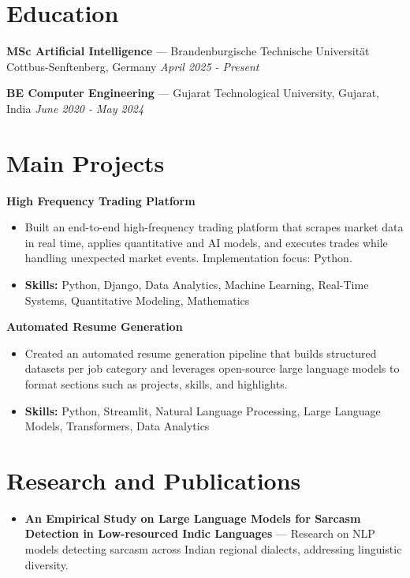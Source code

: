 \documentclass[a4paper,10pt]{article}
\begin{document}
\section*{Education}
\textbf{MSc Artificial Intelligence} — Brandenburgische Technische Universität Cottbus-Senftenberg, Germany \hfill \textit{April 2025 - Present}\par
\vspace{1.5pt}
\textbf{BE Computer Engineering} — Gujarat Technological University, Gujarat, India \hfill \textit{June 2020 - May 2024}\par

\section*{Main Projects}
\textbf{High Frequency Trading Platform}\par
\vspace{1pt}
\begin{itemize}
  \item Built an end-to-end high-frequency trading platform that scrapes market data in real time, applies quantitative and AI models, and executes trades while handling unexpected market events. Implementation focus: Python.
  \item \textbf{Skills:} Python, Django, Data Analytics, Machine Learning, Real-Time Systems, Quantitative Modeling, Mathematics
\end{itemize}
\vspace{3pt}
\textbf{Automated Resume Generation}\par
\vspace{1pt}
\begin{itemize}
  \item Created an automated resume generation pipeline that builds structured datasets per job category and leverages open-source large language models to format sections such as projects, skills, and highlights.
  \item \textbf{Skills:} Python, Streamlit, Natural Language Processing, Large Language Models, Transformers, Data Analytics
\end{itemize}

\section*{Research and Publications}
\begin{itemize}
\item \textbf{An Empirical Study on Large Language Models for Sarcasm Detection in Low-resourced Indic Languages} — Research on NLP models detecting sarcasm across Indian regional dialects, addressing linguistic diversity.
\end{itemize}
\end{document}
